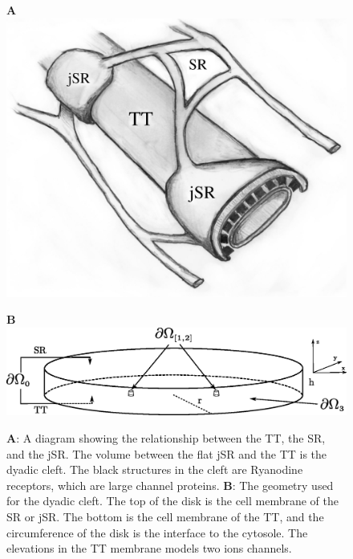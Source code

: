 \newcommand{\figheight}{3.5cm}
\begin{figure}[t]
  \centering
  \begin{minipage}[t]{0.35\linewidth}
    \large \textbf{A}\\
    \includegraphics[width=\linewidth]{chapters/hake/eps/SR_TT}
  \end{minipage}
  \begin{minipage}[t]{0.64\linewidth}
    \large \textbf{B}\\
    \includegraphics[width=\linewidth]{chapters/hake/eps/disk}
  \end{minipage}
  \caption{\textbf{A}: A diagram showing the relationship between the TT, the SR, and the jSR. The volume between the flat jSR and the TT is the dyadic cleft. The black structures in the cleft are Ryanodine receptors, which are large channel proteins. \textbf{B}: The geometry used for the dyadic cleft. The top of the disk is the cell membrane of the SR or jSR. The bottom is the cell membrane of the TT, and the circumference of the disk is the interface to the cytosole. The elevations in the TT membrane models two ions channels.}
\label{fig:morphology}
\end{figure}

